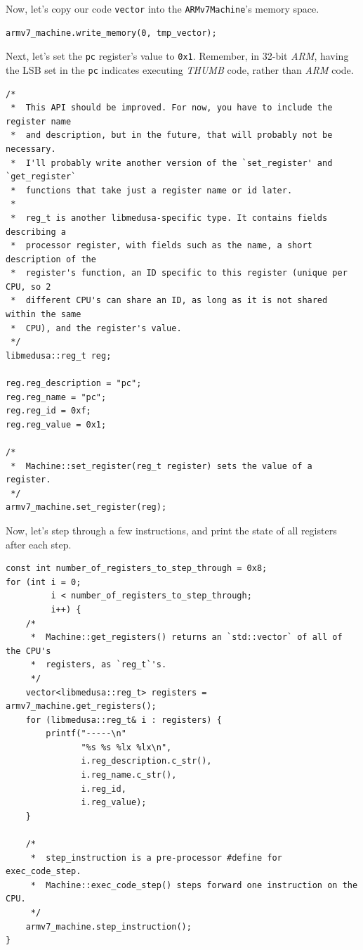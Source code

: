 \documentclass{report}
\begin{document}
	Now, let's copy our code \texttt{vector} into the \texttt{ARMv7Machine}'s
	memory space.

	\begin{lstlisting}
armv7_machine.write_memory(0, tmp_vector);
	\end{lstlisting}

	Next, let's set the \texttt{pc} register's value to \texttt{0x1}. Remember,
	in 32-bit \textit{ARM}, having the LSB set in the \texttt{pc} indicates
	executing \textit{THUMB} code, rather than \textit{ARM} code.

	\begin{lstlisting}
/*
 *  This API should be improved. For now, you have to include the register name
 *  and description, but in the future, that will probably not be necessary.
 *  I'll probably write another version of the `set_register' and `get_register`
 *  functions that take just a register name or id later.
 *
 *  reg_t is another libmedusa-specific type. It contains fields describing a
 *  processor register, with fields such as the name, a short description of the
 *  register's function, an ID specific to this register (unique per CPU, so 2
 *  different CPU's can share an ID, as long as it is not shared within the same
 *  CPU), and the register's value.
 */
libmedusa::reg_t reg;

reg.reg_description = "pc";
reg.reg_name = "pc";
reg.reg_id = 0xf;
reg.reg_value = 0x1;

/*
 *  Machine::set_register(reg_t register) sets the value of a register.
 */
armv7_machine.set_register(reg);
	\end{lstlisting}

	Now, let's step through a few instructions, and print the state of all
	registers after each step.

	\begin{lstlisting}
const int number_of_registers_to_step_through = 0x8;
for (int i = 0;
		 i < number_of_registers_to_step_through;
		 i++) {
	/*
	 *  Machine::get_registers() returns an `std::vector` of all of the CPU's
	 *  registers, as `reg_t`'s.
	 */
	vector<libmedusa::reg_t> registers = armv7_machine.get_registers();
	for (libmedusa::reg_t& i : registers) {
		printf("-----\n"
			   "%s %s %lx %lx\n",
			   i.reg_description.c_str(),
			   i.reg_name.c_str(),
			   i.reg_id,
			   i.reg_value);
	}
	
	/*
	 *  step_instruction is a pre-processor #define for exec_code_step.
	 *  Machine::exec_code_step() steps forward one instruction on the CPU.
	 */
	armv7_machine.step_instruction();
}
	\end{lstlisting}
\end{document}
